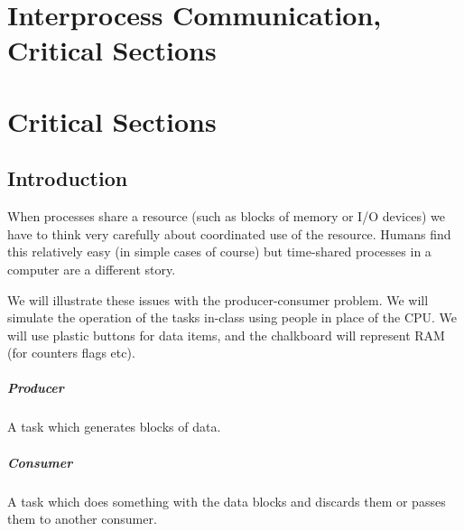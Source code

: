 %
%
%
%
%
% 
%
%
\section*{ Interprocess Communication, Critical Sections}

\section{Critical Sections}
\subsection*{Introduction}

When processes share a resource (such as blocks of memory
or I/O devices) we have to think very carefully about coordinated
use of the resource.  Humans find this relatively easy (in
simple cases of course) but time-shared processes in a computer
are a different story.

We will illustrate these issues with the producer-consumer
problem.  We will simulate the operation of the tasks in-class
using people in place of the CPU.  We will use plastic buttons
for data items, and the chalkboard will represent RAM (for
counters flags etc).

\subparagraph{Producer} A task which generates blocks of data.

\subparagraph{Consumer} A task which does something with the data
blocks and discards them or passes them to another consumer.


